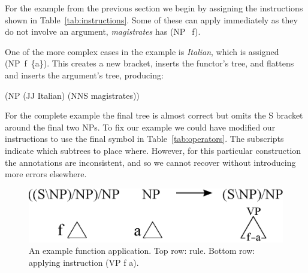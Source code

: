 For the example from the previous section we begin by assigning the
instructions shown in Table~\ref{tab:instructions}.  Some of these can apply
immediately as they do not involve an argument, \myeg \textit{magistrates} has (NP$\;$~f).

One of the more complex cases in the example is \textit{Italian}, which is
assigned (NP~f~\{a\}). This creates a new bracket, inserts the functor's tree, and
flattens and inserts the argument's tree, producing:

\vspace{1mm}
{\footnotesize
(NP (JJ Italian) (NNS magistrates))
}
\vspace{1mm}




For the complete example the final tree is almost correct but omits the S
bracket around the final two NPs.  To fix our example we could have modified
our instructions to use the final symbol in Table~\ref{tab:operators}.  The
subscripts indicate which subtrees to place where.
However, for this particular construction the \ptb annotations are
inconsistent, and so we cannot recover without introducing more errors elsewhere.

\begin{figure}
\begin{center}
\includegraphics[width=0.85\linewidth]{figures/ccg-example}
\end{center}
\caption{\label{fig:inst-example}
An example function application.
Top row: \ccg rule.
Bottom row: applying instruction (VP f a).
}
\end{figure}

